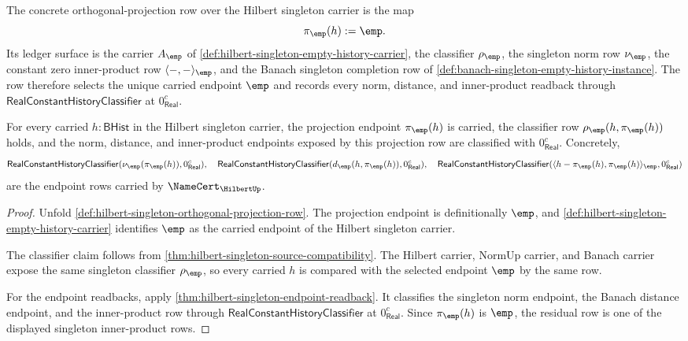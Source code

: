 \begin{definition}
\label{def:hilbert-singleton-orthogonal-projection-row}
The concrete orthogonal-projection row over the Hilbert singleton carrier is
the map
$$
\pi_{\emp}(h):=\emp .
$$
Its ledger surface is the carrier $A_{\emp}$ of
\autoref{def:hilbert-singleton-empty-history-carrier}, the classifier
$\rho_{\emp}$, the singleton norm row $\nu_{\emp}$, the constant zero
inner-product row $\langle-,-\rangle_{\emp}$, and the Banach singleton
completion row of \autoref{def:banach-singleton-empty-history-instance}. The
row therefore selects the unique carried endpoint $\emp$ and records every
norm, distance, and inner-product readback through
$\mathsf{RealConstantHistoryClassifier}$ at $0_{\mathsf{Real}}^{c}$.
\end{definition}

\begin{theorem}
\label{thm:hilbert-singleton-projection-carried-endpoint}
For every carried $h:\mathsf{BHist}$ in the Hilbert singleton carrier, the
projection endpoint $\pi_{\emp}(h)$ is carried, the classifier row
$\rho_{\emp}(h,\pi_{\emp}(h))$ holds, and the norm, distance, and
inner-product endpoints exposed by this projection row are classified with
$0_{\mathsf{Real}}^{c}$. Concretely,
$$
\mathsf{RealConstantHistoryClassifier}(\nu_{\emp}(\pi_{\emp}(h)),
0_{\mathsf{Real}}^{c}),
\quad
\mathsf{RealConstantHistoryClassifier}(d_{\emp}(h,\pi_{\emp}(h)),
0_{\mathsf{Real}}^{c}),
\quad
\mathsf{RealConstantHistoryClassifier}
  (\langle h-\pi_{\emp}(h),\pi_{\emp}(h)\rangle_{\emp},
   0_{\mathsf{Real}}^{c})
$$
are the endpoint rows carried by $\NameCert_{\HilbertUp}$.
\end{theorem}
\begin{proof}
Unfold \autoref{def:hilbert-singleton-orthogonal-projection-row}. The
projection endpoint is definitionally $\emp$, and
\autoref{def:hilbert-singleton-empty-history-carrier} identifies $\emp$ as
the carried endpoint of the Hilbert singleton carrier.

The classifier claim follows from
\autoref{thm:hilbert-singleton-source-compatibility}. The Hilbert carrier,
NormUp carrier, and Banach carrier expose the same singleton classifier
$\rho_{\emp}$, so every carried $h$ is compared with the selected endpoint
$\emp$ by the same row.

For the endpoint readbacks, apply
\autoref{thm:hilbert-singleton-endpoint-readback}. It classifies the singleton
norm endpoint, the Banach distance endpoint, and the inner-product row through
$\mathsf{RealConstantHistoryClassifier}$ at $0_{\mathsf{Real}}^{c}$. Since
$\pi_{\emp}(h)$ is $\emp$, the residual row is one of the displayed singleton
inner-product rows.
\end{proof}

